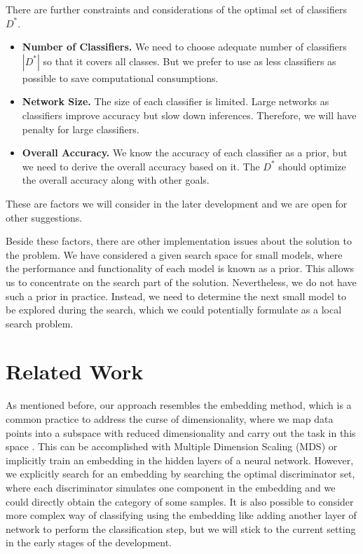 \documentclass[acmsmall,nonacm]{acmart}\settopmatter{}
\begin{document}
There are further constraints and considerations of the optimal set of classifiers $D^*$.
\begin{itemize}
    \item \textbf{Number of Classifiers.} We need to choose adequate number of classifiers $|D^*|$ so that it covers all classes. But we prefer to use as less classifiers as possible to save computational consumptions.
    \item \textbf{Network Size.} The size of each classifier is limited. Large networks as classifiers improve accuracy but slow down inferences. Therefore, we will have penalty for large classifiers.
    \item \textbf{Overall Accuracy.} We know the accuracy of each classifier as a prior, but we need to derive the overall accuracy based on it. The $D^*$ should optimize the overall accuracy along with other goals.
\end{itemize}
These are factors we will consider in the later development and we are open for other suggestions.

Beside these factors, there are other implementation issues about the solution to the problem.
We have considered a given search space for small models, where the performance and functionality of each model is known as a prior.
This allows us to concentrate on the search part of the solution.
Nevertheless, we do not have such a prior in practice.
Instead, we need to determine the next small model to be explored during the search, which we could potentially formulate as a local search problem.

\section{Related Work}
As mentioned before, our approach resembles the embedding method, which is a common practice to address the curse of dimensionality, where we map data points into a subspace with reduced dimensionality and carry out the task in this space \cite{2016ml}.
This can be accomplished with Multiple Dimension Scaling (MDS) \cite{cox2000multidimensional} or implicitly train an embedding in the hidden layers of a neural network.
However, we explicitly search for an embedding by searching the optimal discriminator set, where each discriminator simulates one component in the embedding and we could directly obtain the category of some samples.
It is also possible to consider more complex way of classifying using the embedding like adding another layer of network to perform the classification step, but we will stick to the current setting in the early stages of the development.


% 
% 




\end{document}
